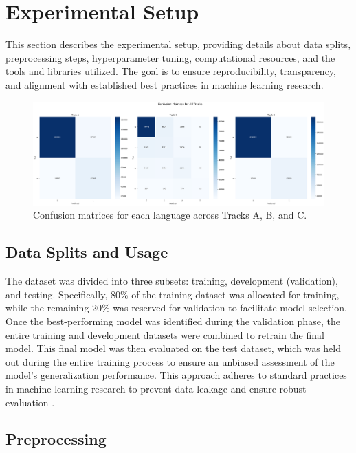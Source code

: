 \section{Experimental Setup}

This section describes the experimental setup, providing details about data splits, preprocessing steps, hyperparameter tuning, computational resources, and the tools and libraries utilized. The goal is to ensure reproducibility, transparency, and alignment with established best practices in machine learning research.
\begin{figure}[t]
    \centering
    \includegraphics[width=1.7\columnwidth]{images/confusion_matrices_all_tracks.png}
    \caption{Confusion matrices for each language across Tracks A, B, and C.}
    \label{fig:confusion_matrices}
\end{figure}

\subsection{Data Splits and Usage}
The dataset\cite{muhammad2025brighterbridginggaphumanannotated} was divided into three subsets: training, development (validation), and testing. Specifically, 80\% of the training dataset was allocated for training, while the remaining 20\% was reserved for validation to facilitate model selection. Once the best-performing model was identified during the validation phase, the entire training and development datasets were combined to retrain the final model. This final model was then evaluated on the test dataset, which was held out during the entire training process to ensure an unbiased assessment of the model's generalization performance. This approach adheres to standard practices in machine learning research to prevent data leakage and ensure robust evaluation \citep{Goodfellow-et-al-2016}.

\subsection{Preprocessing}

